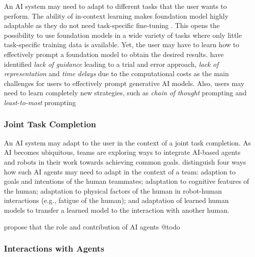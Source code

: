 An AI system may need to adapt to different tasks that the user wants to perform. The ability of in-context learning makes
foundation model highly adaptable as they do not need task-specific fine-tuning \citep{brownLanguageModelsAre2020}. This opens
the possibility to use foundation models in a wide variety of tasks where only little task-specific training data is available.
Yet, the user may have to learn how to effectively prompt a foundation model to obtain the desired results. \cite{dangHowPromptOpportunities2022}
have identified \textit{lack of guidance} leading to a trial and error approach, \textit{lack of representation} and \textit{time delays}
due to the computational costs as the main challenges for users to effectively prompt generative AI models. Also, users may need to
learn completely new strategies, such as \textit{chain of thought} prompting \citep{weiChainofThoughtPromptingElicits2023} and 
\textit{least-to-most} prompting \citep{zhouLeasttoMostPromptingEnables2023}

\subsubsection{Joint Task Completion}

An AI system may adapt to the user in the context of a joint task completion. As AI becomes ubiquitous, teams are exploring ways to
integrate AI-based agents and robots in their work towards achieving common goals. \cite{zhaoRoleAdaptationCollective2022} distinguish
four ways how such AI agents may need to adapt in the context of a team: adaption to goals and intentions of the human teammates;
adaptation to cognitive features of the human; adaptation to physical factors of the human in robot-human interactions (e.g., fatigue
of the human); and adaptation of learned human models to transfer a learned model to the interaction with another human.

\cite{hauptmanAdaptOvercomePerceptions2023} propose that the role and contribution of AI agents 
{\color{purple} @todo}


\subsubsection{Interactions with Agents}

